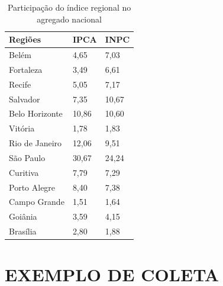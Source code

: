 \documentclass[twoside,a4paper,11pt]{report}
\begin{document}
{\begin{table}[h]
\centering
\begin{tabular}{lll}
\hline
\multicolumn{1}{l|}{Regiões} & \multicolumn{1}{l|}{IPCA} & INPC  \\ \hline
Belém                      & 4,65                      & 7,03  \\
Fortaleza                  & 3,49                      & 6,61  \\
Recife                     & 5,05                      & 7,17  \\
Salvador                   & 7,35                      & 10,67 \\
Belo Horizonte             & 10,86                     & 10,60 \\
Vitória                    & 1,78                      & 1,83  \\
Rio de Janeiro             & 12,06                     & 9,51  \\
São Paulo                  & 30,67                     & 24,24 \\
Curitiva                   & 7,79                      & 7,29  \\
Porto Alegre               & 8,40                      & 7,38  \\
Campo Grande               & 1,51                      & 1,64  \\
Goiânia                    & 3,59                      & 4,15  \\
Brasília                   & 2,80                      & 1,88  \\ \hline
\end{tabular}
\caption{Participação do índice regional no agregado nacional}
\label{table:02}
\end{table}

\chapter{EXEMPLO DE COLETA}\label{ap2}

}
\end{document}
